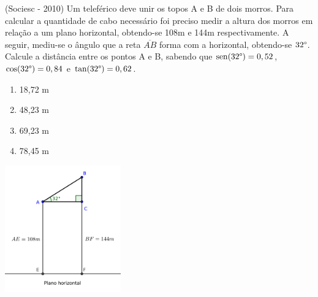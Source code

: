  \begin{exer}
 (Sociesc - 2010) Um teleférico deve unir os topos A e B de dois morros. Para calcular a quantidade de cabo necessário foi preciso medir a altura dos morros em relação a um plano horizontal, obtendo-se 108m e 144m respectivamente. A seguir, mediu-se o ângulo que a reta $\overline{AB}$ forma com a horizontal, obtendo-se $32\degree$. Calcule a distância entre os pontos A e B, sabendo que $\operatorname{sen} (32\degree)= 0,52$, $\cos (32\degree)= 0,84$ e $\tan (32\degree)= 0,62$.

 \begin{multicols}{2}

 \begin{enumerate}
  \item 18,72 m
  \item 48,23 m
  \item 69,23 m
  \item 78,45 m
 \end{enumerate}

 \includegraphics[width=5cm]{./cap_trigon/figs/tri_ret_exer3.pdf}

 \end{multicols}
 \end{exer}
 
